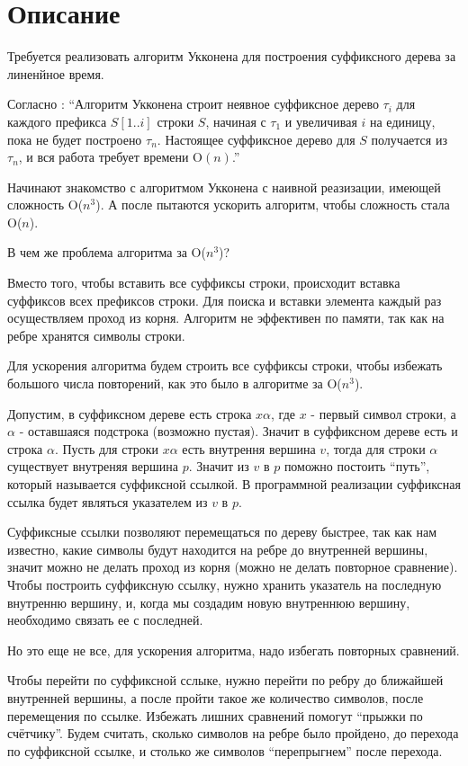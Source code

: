 \section{Описание}

Требуется реализовать алгоритм Укконена для построения суффиксного дерева за линенйное время.


Согласно \cite{Gasfild}: \enquote{Алгоритм Укконена строит неявное суффиксное дерево $\tau_i$ для каждого префикса $S[1..i]$ строки $S$, 
начиная с $\tau_1$ и увеличивая $i$ на единицу, пока не будет построено $\tau_n$. 
Настоящее суффиксное дерево для $S$ получается из $\tau_n$, и вся работа требует времени O$(n)$.}

Начинают знакомство с алгоритмом Укконена с наивной реазизации, имеющей сложность O($n^3$). А после пытаются ускорить алгоритм,
чтобы сложность стала O($n$).

В чем же проблема алгоритма за O($n^3$)? 

Вместо того, чтобы вставить все суффиксы строки, происходит вставка суффиксов всех префиксов строки.
Для поиска и вставки элемента каждый раз осуществляем проход из корня. Алгоритм не эффективен по памяти, 
так как на ребре хранятся символы строки.

Для ускорения алгоритма будем строить все суффиксы строки, чтобы избежать большого числа повторений, 
как это было в алгоритме за O($n^3$).

Допустим, в суффиксном дереве есть строка $x\alpha$, где $x$ - первый символ строки, 
а $\alpha$ - оставшаяся подстрока (возможно пустая). Значит в суффиксном дереве есть и строка $\alpha$. 
Пусть для строки $x\alpha$ есть внутрення вершина $v$, тогда для строки $\alpha$ существует внутреняя вершина $p$.
Значит из $v$ в $p$ поможно постоить \enquote{путь}, который называется суффиксной ссылкой. В программной реализации суффиксная ссылка
будет являться указателем из $v$ в $p$.

Суффиксные ссылки позволяют перемещаться по дереву быстрее, так как нам известно, 
какие символы будут находится на ребре до внутренней вершины, значит можно не делать проход из корня (можно не делать повторное сравнение). 
Чтобы построить суффиксную ссылку, нужно хранить указатель на последную внутренню вершину, и, 
когда мы создадим новую внутреннюю вершину, необходимо связать ее с последней.

Но это еще не все, для ускорения алгоритма, надо избегать повторных сравнений.

Чтобы перейти по суффиксной сслыке, нужно перейти по ребру до ближайшей внутренней вершины, а после пройти такое же количество 
символов, после перемещения по ссылке. Избежать лишних сравнений помогут \enquote{прыжки по счётчику}. Будем считать, сколько символов на ребре 
было пройдено, до перехода по суффиксной ссылке, и столько же символов \enquote{перепрыгнем} после перехода.

